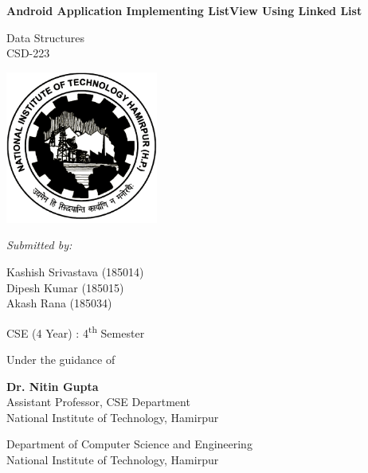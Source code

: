 \documentclass[11pt,a4paper]{report}
\begin{document}
\begin{titlepage}
    \begin{center}

        \Huge{\textbf{Android Application Implementing ListView Using Linked List}}
 
        \vspace{0.5cm}
        
        \normalsize
       
        \vspace{10pt}
        
    	Data Structures\\
        CSD-223

        
        
        \vspace{15pt}
        \includegraphics[height=5cm]{./img/logo.png}
        
        \vspace{10pt}
        \textit{Submitted by:}

            Kashish Srivastava (185014)\\
            Dipesh Kumar (185015)\\
            Akash Rana (185034)
        \vspace{5pt}
        
        CSE (4 Year) : 
        4\textsuperscript{th} Semester
 
        \vspace{15pt}
 
        Under the guidance of
        
        \vspace{5pt}
        
        \textbf{Dr. Nitin Gupta }\\
        Assistant Professor, CSE Department\\
        National Institute of Technology, Hamirpur\\
 
        \vspace{25pt}
        
        \large
 
        Department of Computer Science and  Engineering\\
        National Institute of Technology, Hamirpur\\
      
    \end{center}
\end{titlepage}
\end{document}
